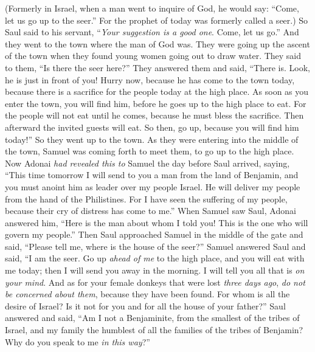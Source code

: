\begin{biblechapter}
\verse (Formerly in Israel, when a man went to inquire of God, he would say: “Come, let us go up to the seer.” For the prophet of today was formerly called a seer.)
\verse So Saul said to his servant, “\textit{Your suggestion is a good one}. Come, let us go.” And they went to the town where the man of God was.
\verse They were going up the ascent of the town when they found young women going out to draw water. They said to them, “Is there the seer here?”
\verse They answered them and said, “There is. Look, he is just in front of you! Hurry now, because he has come to the town today, because there is a sacrifice for the people today at the high place.
\verse As soon as you enter the town, you will find him, before he goes up to the high place to eat. For the people will not eat until he comes, because he must bless the sacrifice. Then afterward the invited guests will eat. So then, go up, because you will find him today!”
\verse So they went up to the town. As they were entering into the middle of the town, Samuel was coming forth to meet them, to go up to the high place.
\verse Now Adonai \textit{had revealed this to} Samuel the day before Saul arrived, saying,
\verse “This time tomorrow I will send to you a man from the land of Benjamin, and you must anoint him as leader over my people Israel. He will deliver my people from the hand of the Philistines. For I have seen the suffering of my people, because their cry of distress has come to me.”
\verse When Samuel saw Saul, Adonai answered him, “Here is the man about whom I told you! This is the one who will govern my people.”
\verse Then Saul approached Samuel in the middle of the gate and said, “Please tell me, where is the house of the seer?”
\verse Samuel answered Saul and said, “I am the seer. Go up \textit{ahead of me} to the high place, and you will eat with me today; then I will send you away in the morning. I will tell you all that is \textit{on your mind}.
\verse And as for your female donkeys that were lost \textit{three days ago}, \textit{do not be concerned about them}, because they have been found. For whom is all the desire of Israel? Is it not for you and for all the house of your father?”
\verse Saul answered and said, “Am I not a Benjaminite, from the smallest of the tribes of Israel, and my family the humblest of all the families of the tribes of Benjamin? Why do you speak to me \textit{in this way}?”

\end{biblechapter}
